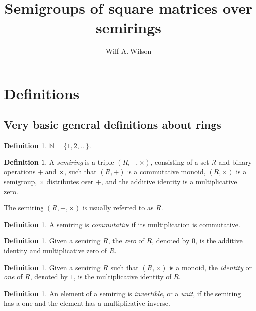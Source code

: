 \documentclass{article}
\title{Semigroups of square matrices over semirings}
\author{Wilf A. Wilson}
\newcommand{\N}{\mathbb{N}}
\theoremstyle{definition}
\newtheorem{defn}[thm]{Definition}
\begin{document}
\maketitle


\section{Definitions}


\subsection{Very basic general definitions about rings}

\begin{defn}
  $\N = \{1, 2, \ldots\}$.
\end{defn}

\begin{defn}
  A \emph{semiring} is a triple $(R, +, \times)$, consisting of a set $R$ and
  binary operations $+$ and $\times$, such that $(R, +)$ is a commutative
  monoid, $(R, \times)$ is a semigroup, $\times$ distributes over $+$, and the
  additive identity is a multiplicative zero.
\end{defn}

The semiring $(R, +, \times)$ is usually referred to as $R$.

\begin{defn}
  A semiring is \emph{commutative} if its multiplication is commutative.
\end{defn}

\begin{defn}
  Given a semiring $R$, the \emph{zero} of $R$, denoted by $0$, is the additive
  identity and multiplicative zero of $R$.
\end{defn}

\begin{defn}
  Given a semiring $R$ such that $(R, \times)$ is a monoid, the \emph{identity}
  or \emph{one} of $R$, denoted by $1$, is the multiplicative identity of $R$.
\end{defn}

\begin{defn}
  An element of a semiring is \emph{invertible}, or a \emph{unit},
  if the semiring has a one and the element has a multiplicative inverse.
\end{defn}
\end{document}
